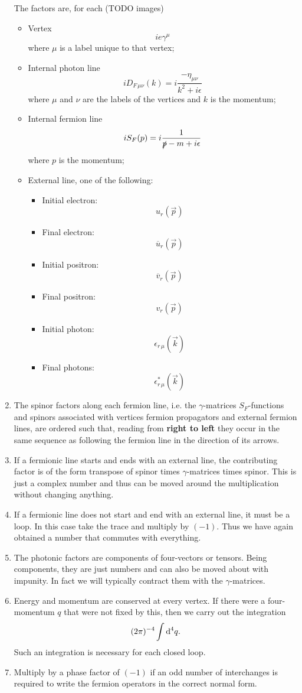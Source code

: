 \begin{enumerate}
The factors are, for each (TODO images)
\begin{itemize}
\item Vertex
\[ ie\gamma^\mu \]
where $\mu$ is a label unique to that vertex;
\item Internal photon line
\[ iD_{F\, \mu\nu}(k) = i \frac{-\eta_{\mu\nu}}{k^2 + i\epsilon} \]
where $\mu$ and $\nu$ are the labels of the vertices and $k$ is the momentum;
\item Internal fermion line
\[ iS_F(p) = i \frac{1}{\slashed{p}-m+i\epsilon} \]
where $p$ is the momentum;
\item External line, one of the following:
\begin{itemize}
\item Initial electron:
\[ u_r(\vec{p}) \]
\item Final electron:
\[ \overline{u}_r(\vec{p}) \]
\item Initial positron:
\[ \overline{v}_r(\vec{p}) \]
\item Final positron:
\[ v_r(\vec{p}) \]
\item Initial photon:
\[ \epsilon_{r\, \mu}(\vec{k}) \]
\item Final photons:
\[ \epsilon^*_{r\, \mu}(\vec{k}) \]
\end{itemize}
\end{itemize}
\item The spinor factors along each fermion line, i.e. the $\gamma$-matrices $S_F$-functions and spinors associated with vertices fermion propagators and external fermion lines, are ordered such that, reading from \textbf{right to left} they occur in the same sequence as following the fermion line in the direction of its arrows.
\item If a fermionic line starts and ends with an external line, the contributing factor is of the form transpose of spinor times $\gamma$-matrices times spinor. This is just a complex number and thus can be moved around the multiplication without changing anything.
\item If a fermionic line does not start and end with an external line, it must be a loop. In this case take the trace and multiply by $(-1)$. Thus we have again obtained a number that commutes with everything.
\item The photonic factors are components of four-vectors or tensors. Being components, they are just numbers and can also be moved about with impunity. In fact we will typically contract them with the $\gamma$-matrices.
\item Energy and momentum are conserved at every vertex. If there were a four-momentum $q$ that were not fixed by this, then we carry out the integration
\[ (2\pi)^{-4}\int \operatorname{d \!}{^4q}. \]
Such an integration is necessary for each closed loop.

\item Multiply by a phase factor of $(-1)$ if an odd number of interchanges is required to write the fermion operators in the correct normal form.
\end{enumerate}

